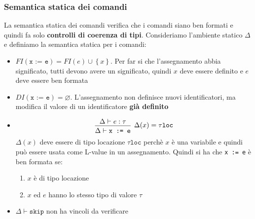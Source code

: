 \documentclass[a4paper]{article}
\begin{document}
\subsubsection{Semantica statica dei comandi}
La semantica statica dei comandi verifica che i comandi siano ben formati e quindi
fa solo \textbf{controlli di coerenza di tipi}. Consideriamo l'ambiente statico \( \Delta \)
e definiamo la semantica statica per i comandi:
\begin{itemize}
\item \( FI(\texttt{x := e}) = FI(e) \cup \left\{ x \right\} \). Per far si che
  l'assegnamento abbia significato, tutti devono avere un significato, quindi
  \( x \) deve essere definito e \( e \) deve essere ben formata

\item \( DI(\texttt{x := e}) = \varnothing \). L'assegnamento non definisce nuovi
  identificatori, ma modifica il valore di un identificatore \textbf{già definito}

\item
  \[
    \begin{prooftree}
      \hypo{ 
        \Delta \vdash e : \tau
      }
      \infer1[\( \Delta(x) = \tau\texttt{loc} \)]{ 
        \Delta \vdash \texttt{x := e}
      }
    \end{prooftree}
  \] 
  \( \Delta(x) \) deve essere di tipo locazione \( \tau\texttt{loc} \) perchè \( x \) è
  una variabile e quindi può essere usata come L-value in un assegnamento.
  Quindi si ha che \texttt{x := e} è ben formata se:
  \begin{enumerate}
    \item \( x \) è di tipo locazione
    \item \( x \) ed \( e \) hanno lo stesso tipo di valore \( \tau \)
  \end{enumerate}

\item \( \Delta \vdash \texttt{skip} \) non ha vincoli da verificare
\end{itemize}
\end{document}
